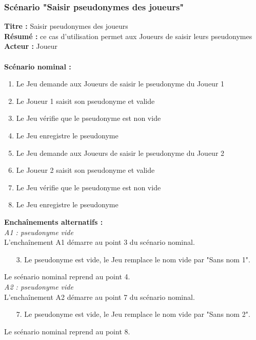 \documentclass[12pt , a4paper]{article}
\begin{document}
\subsubsection{Scénario "Saisir pseudonymes des joueurs"}
\noindent\textbf{Titre : } Saisir pseudonymes des joueurs\\
\textbf{Résumé : } ce cas d'utilisation permet aux Joueurs de saisir leurs pseudonymes\\
\textbf{Acteur : } Joueur\\ \\
\textbf{Scénario nominal :}
\begin{enumerate}
\item Le Jeu demande aux Joueurs de saisir le pseudonyme du Joueur 1
\item Le Joueur 1 saisit son pseudonyme et valide
\item Le Jeu vérifie que le pseudonyme est non vide
\item Le Jeu enregistre le pseudonyme
\item Le Jeu demande aux Joueurs de saisir le pseudonyme du Joueur 2
\item Le Joueur 2 saisit son pseudonyme et valide
\item Le Jeu vérifie que le pseudonyme est non vide
\item Le Jeu enregistre le pseudonyme
\end{enumerate}
\textbf{Encha\^inements alternatifs :}\\
\textit{A1 : pseudonyme vide}\\
L'encha\^inement A1 démarre au point 3 du scénario nominal.
\begin{enumerate}
\item[3.] Le pseudonyme est vide, le Jeu remplace le nom vide par "Sans nom 1".
\end{enumerate}
Le scénario nominal reprend au point 4.\\

\noindent\textit{A2 : pseudonyme vide}\\
L'encha\^inement A2 démarre au point 7 du scénario nominal.
\begin{enumerate}
\item[7.] Le pseudonyme est vide, le Jeu remplace le nom vide par "Sans nom 2".
\end{enumerate}
Le scénario nominal reprend au point 8.
\end{document}
